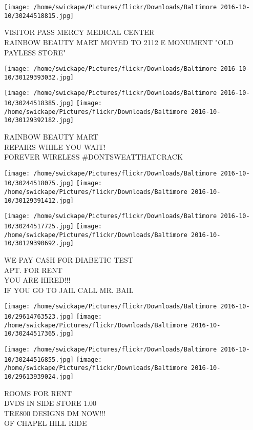 \documentclass[10pt,letterpaper]{article}
\begin{document}
\vspace{0.25in}
\texttt{[image: /home/swickape/Pictures/flickr/Downloads/Baltimore 2016-10-10/30244518815.jpg]}

VISITOR PASS MERCY MEDICAL CENTER\\
RAINBOW BEAUTY MART MOVED TO 2112 E MONUMENT "OLD PAYLESS STORE"
\pagebreak

\texttt{[image: /home/swickape/Pictures/flickr/Downloads/Baltimore 2016-10-10/30129393032.jpg]}

\vspace{0.25in}
\texttt{[image: /home/swickape/Pictures/flickr/Downloads/Baltimore 2016-10-10/30244518385.jpg]}
\texttt{[image: /home/swickape/Pictures/flickr/Downloads/Baltimore 2016-10-10/30129392182.jpg]}

RAINBOW BEAUTY MART\\
REPAIRS WHILE YOU WAIT!\\
FOREVER WIRELESS \#DONTSWEATTHATCRACK
\pagebreak

\texttt{[image: /home/swickape/Pictures/flickr/Downloads/Baltimore 2016-10-10/30244518075.jpg]}
\texttt{[image: /home/swickape/Pictures/flickr/Downloads/Baltimore 2016-10-10/30129391412.jpg]}

\texttt{[image: /home/swickape/Pictures/flickr/Downloads/Baltimore 2016-10-10/30244517725.jpg]}
\texttt{[image: /home/swickape/Pictures/flickr/Downloads/Baltimore 2016-10-10/30129390692.jpg]}

WE PAY CA\$H FOR DIABETIC TEST\\
APT. FOR RENT\\
YOU ARE HIRED!!!\\
IF YOU GO TO JAIL CALL MR. BAIL
\pagebreak

\texttt{[image: /home/swickape/Pictures/flickr/Downloads/Baltimore 2016-10-10/29614763523.jpg]}
\texttt{[image: /home/swickape/Pictures/flickr/Downloads/Baltimore 2016-10-10/30244517365.jpg]}

\texttt{[image: /home/swickape/Pictures/flickr/Downloads/Baltimore 2016-10-10/30244516855.jpg]}
\texttt{[image: /home/swickape/Pictures/flickr/Downloads/Baltimore 2016-10-10/29613939024.jpg]}

ROOMS FOR RENT\\
DVDS IN SIDE STORE 1.00\\
TRE800 DESIGNS DM NOW!!!\\
OF CHAPEL HILL RIDE
\pagebreak
\end{document}
